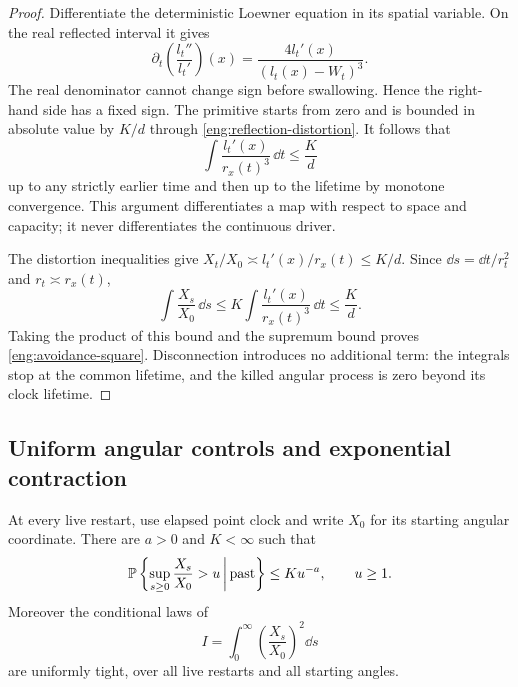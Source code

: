 \begin{proof}
Differentiate the deterministic Loewner equation in its spatial
variable.  On the real reflected interval it gives
\begin{equation}\label{eng:logarithmic-derivative}
 \partial_t\left(\frac{l_t''}{l_t'}\right)(x)
   =\frac{4l_t'(x)}{(l_t(x)-W_t)^3}.
\end{equation}
The real denominator cannot change sign before swallowing.  Hence the
right-hand side has a fixed sign.  The primitive starts from zero and
is bounded in absolute value by $K/d$ through
\eqref{eng:reflection-distortion}.  It follows that
\begin{equation}\label{eng:real-integral}
 \int\frac{l_t'(x)}{r_x(t)^3}\,\dd t\le\frac Kd
\end{equation}
up to any strictly earlier time and then up to the lifetime by monotone
convergence.  This argument differentiates a map with respect to space
and capacity; it never differentiates the continuous driver.

The distortion inequalities give
$X_t/X_0\asymp l_t'(x)/r_x(t)\le K/d$.  Since
$\dd s=\dd t/r_t^2$ and $r_t\asymp r_x(t)$,
\[
 \int\frac{X_s}{X_0}\,\dd s
 \le K\int\frac{l_t'(x)}{r_x(t)^3}\,\dd t\le\frac Kd.
\]
Taking the product of this bound and the supremum bound proves
\eqref{eng:avoidance-square}.  Disconnection introduces no additional
term: the integrals stop at the common lifetime, and the killed angular
process is zero beyond its clock lifetime.
\end{proof}

\subsection{Uniform angular controls and exponential contraction}

\begin{lemma}\label{eng:controls}
At every live restart, use elapsed point clock and write $X_0$ for its
starting angular coordinate.  There are $a>0$ and $K<\infty$ such that
\begin{equation}\label{eng:supremum-tail}
 \mathbb P\left\{\sup_{s\ge0}\frac{X_s}{X_0}>u
       \,\middle|\,\text{past}\right\}\le Ku^{-a},\qquad u\ge1.
\end{equation}
Moreover the conditional laws of
\begin{equation}\label{eng:occupation}
 I=\int_0^\infty\left(\frac{X_s}{X_0}\right)^2\dd s
\end{equation}
are uniformly tight, over all live restarts and all starting angles.
\end{lemma}

